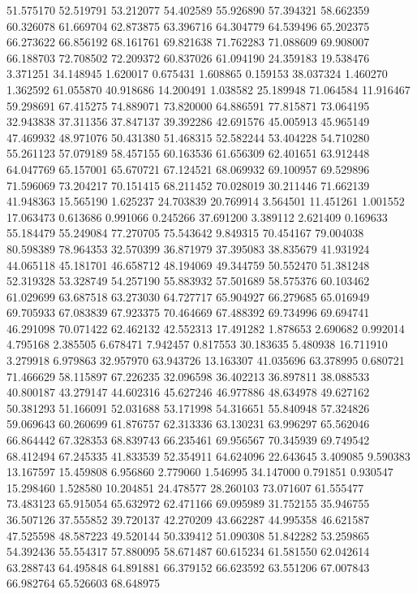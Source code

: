 51.575170
52.519791
53.212077
54.402589
55.926890
57.394321
58.662359
60.326078
61.669704
62.873875
63.396716
64.304779
64.539496
65.202375
66.273622
66.856192
68.161761
69.821638
71.762283
71.088609
69.908007
66.188703
72.708502
72.209372
60.837026
61.094190
24.359183
19.538476
3.371251
34.148945
1.620017
0.675431
1.608865
0.159153
38.037324
1.460270
1.362592
61.055870
40.918686
14.200491
1.038582
25.189948
71.064584
11.916467
59.298691
67.415275
74.889071
73.820000
64.886591
77.815871
73.064195
32.943838
37.311356
37.847137
39.392286
42.691576
45.005913
45.965149
47.469932
48.971076
50.431380
51.468315
52.582244
53.404228
54.710280
55.261123
57.079189
58.457155
60.163536
61.656309
62.401651
63.912448
64.047769
65.157001
65.670721
67.124521
68.069932
69.100957
69.529896
71.596069
73.204217
70.151415
68.211452
70.028019
30.211446
71.662139
41.948363
15.565190
1.625237
24.703839
20.769914
3.564501
11.451261
1.001552
17.063473
0.613686
0.991066
0.245266
37.691200
3.389112
2.621409
0.169633
55.184479
55.249084
77.270705
75.543642
9.849315
70.454167
79.004038
80.598389
78.964353
32.570399
36.871979
37.395083
38.835679
41.931924
44.065118
45.181701
46.658712
48.194069
49.344759
50.552470
51.381248
52.319328
53.328749
54.257190
55.883932
57.501689
58.575376
60.103462
61.029699
63.687518
63.273030
64.727717
65.904927
66.279685
65.016949
69.705933
67.083839
67.923375
70.464669
67.488392
69.734996
69.694741
46.291098
70.071422
62.462132
42.552313
17.491282
1.878653
2.690682
0.992014
4.795168
2.385505
6.678471
7.942457
0.817553
30.183635
5.480938
16.711910
3.279918
6.979863
32.957970
63.943726
13.163307
41.035696
63.378995
0.680721
71.466629
58.115897
67.226235
32.096598
36.402213
36.897811
38.088533
40.800187
43.279147
44.602316
45.627246
46.977886
48.634978
49.627162
50.381293
51.166091
52.031688
53.171998
54.316651
55.840948
57.324826
59.069643
60.260699
61.876757
62.313336
63.130231
63.996297
65.562046
66.864442
67.328353
68.839743
66.235461
69.956567
70.345939
69.749542
68.412494
67.245335
41.833539
52.354911
64.624096
22.643645
3.409085
9.590383
13.167597
15.459808
6.956860
2.779060
1.546995
34.147000
0.791851
0.930547
15.298460
1.528580
10.204851
24.478577
28.260103
73.071607
61.555477
73.483123
65.915054
65.632972
62.471166
69.095989
31.752155
35.946755
36.507126
37.555852
39.720137
42.270209
43.662287
44.995358
46.621587
47.525598
48.587223
49.520144
50.339412
51.090308
51.842282
53.259865
54.392436
55.554317
57.880095
58.671487
60.615234
61.581550
62.042614
63.288743
64.495848
64.891881
66.379152
66.623592
63.551206
67.007843
66.982764
65.526603
68.648975
